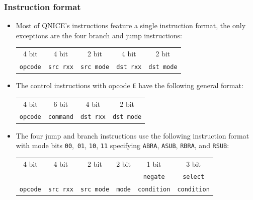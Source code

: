 \documentclass{beamer}
\begin{document}
%
   \begin{frame}
    \frametitle{Instruction format}
    \begin{itemize}
     \item Most of QNICE's instructions feature a single instruction 
      format, the only exceptions are the four branch and jump instructions:
      \begin{center}
       \begin{tabular}{|c||c|c||c|c|}
        \hline
         4 bit&4 bit&2 bit&4 bit&2 bit\\
         {\tt opcode}&{\tt src rxx}&{\tt src mode}&
                      {\tt dst rxx}&{\tt dst mode}\\
        \hline
       \end{tabular}
      \end{center}
     \item The control instructions with opcode \texttt{E} have the 
      following general format:
      \begin{center}
       \begin{tabular}{|c||c||c|c|}
        \hline
         4 bit&6 bit&4 bit&2 bit\\
         {\tt opcode}&{\tt command}&{\tt dst rxx}&\texttt{dst mode}\\
        \hline
       \end{tabular}
      \end{center}
     \item The four jump and branch instructions use the following instruction
      format with mode bits \texttt{00}, \texttt{01}, \texttt{10},
      \texttt{11} specifying \texttt{ABRA}, \texttt{ASUB}, \texttt{RBRA}, 
      and \texttt{RSUB}:
      {\scriptsize
       \begin{center}
        \begin{tabular}{|c||c|c||c||c|c|}
         \hline
          4 bit&4 bit&2 bit&2 bit&1 bit&3 bit\\
               &     &     &     &{\tt negate}&{\tt select}\\
          {\tt opcode}&{\tt src rxx}&{\tt src mode}&
                       {\tt mode}&{\tt condition}&{\tt condition}\\
         \hline
        \end{tabular}
       \end{center}
      }
    \end{itemize}
   \end{frame}
\end{document}
